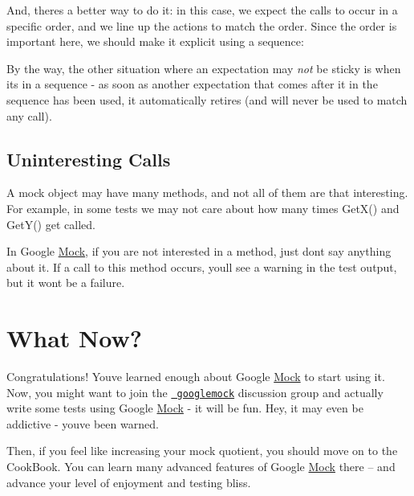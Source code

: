 And, there\textquotesingle{}s a better way to do it\+: in this case, we expect the calls to occur in a specific order, and we line up the actions to match the order. Since the order is important here, we should make it explicit using a sequence\+:


\begin{DoxyCode}{0}
\DoxyCodeLine{\{}
\DoxyCodeLine{}
\DoxyCodeLine{  \}}
\DoxyCodeLine{\}}
\end{DoxyCode}


By the way, the other situation where an expectation may {\itshape not} be sticky is when it\textquotesingle{}s in a sequence -\/ as soon as another expectation that comes after it in the sequence has been used, it automatically retires (and will never be used to match any call).

\subsection*{Uninteresting Calls}

A mock object may have many methods, and not all of them are that interesting. For example, in some tests we may not care about how many times {\ttfamily Get\+X()} and {\ttfamily Get\+Y()} get called.

In Google \mbox{\hyperlink{class_mock}{Mock}}, if you are not interested in a method, just don\textquotesingle{}t say anything about it. If a call to this method occurs, you\textquotesingle{}ll see a warning in the test output, but it won\textquotesingle{}t be a failure.

\section*{What Now?}

Congratulations! You\textquotesingle{}ve learned enough about Google \mbox{\hyperlink{class_mock}{Mock}} to start using it. Now, you might want to join the \href{http://groups.google.com/group/googlemock}\texttt{ googlemock} discussion group and actually write some tests using Google \mbox{\hyperlink{class_mock}{Mock}} -\/ it will be fun. Hey, it may even be addictive -\/ you\textquotesingle{}ve been warned.

Then, if you feel like increasing your mock quotient, you should move on to the Cook\+Book. You can learn many advanced features of Google \mbox{\hyperlink{class_mock}{Mock}} there -- and advance your level of enjoyment and testing bliss. 